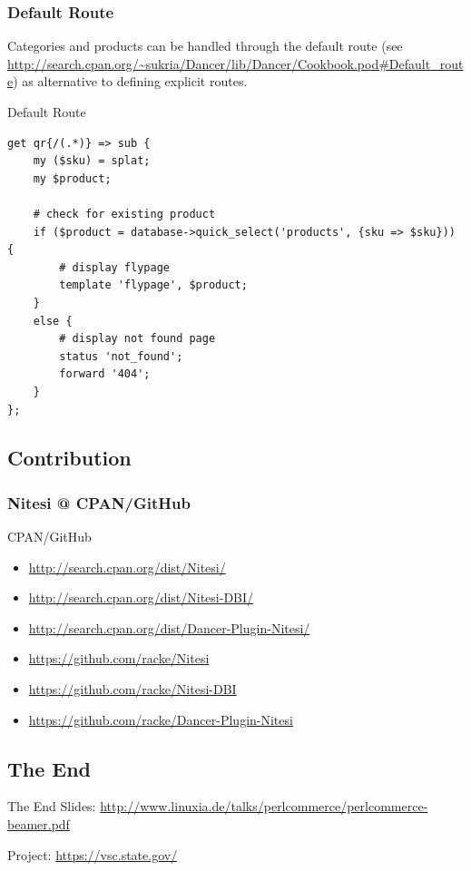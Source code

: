 \subsubsection{Default Route}
Categories and products can be handled through the default route
(see
\url{http://search.cpan.org/~sukria/Dancer/lib/Dancer/Cookbook.pod#Default_route})
as alternative to defining explicit routes.

\begin{frame}[fragile]{Default Route}
\begin{lstlisting}
get qr{/(.*)} => sub {
    my ($sku) = splat;
    my $product;

    # check for existing product
    if ($product = database->quick_select('products', {sku => $sku})) {
        # display flypage
        template 'flypage', $product;
    }
    else {
        # display not found page
        status 'not_found';
        forward '404';
    }
};
\end{lstlisting}
\end{frame}

\subsection{Contribution}
\subsubsection{Nitesi @ CPAN/GitHub}
\begin{frame}{CPAN/GitHub}
\begin{itemize}
\item \url{http://search.cpan.org/dist/Nitesi/}
\item \url{http://search.cpan.org/dist/Nitesi-DBI/}
\item \url{http://search.cpan.org/dist/Dancer-Plugin-Nitesi/}
\end{itemize}
\begin{itemize}
\item \url{https://github.com/racke/Nitesi}
\item \url{https://github.com/racke/Nitesi-DBI}
\item \url{https://github.com/racke/Dancer-Plugin-Nitesi}
\end{itemize}
\end{frame}

\subsection{The End}
\begin{frame}{The End}
Slides:
\url{http://www.linuxia.de/talks/perlcommerce/perlcommerce-beamer.pdf}

Project:
\url{https://vsc.state.gov/}
\end{frame}


